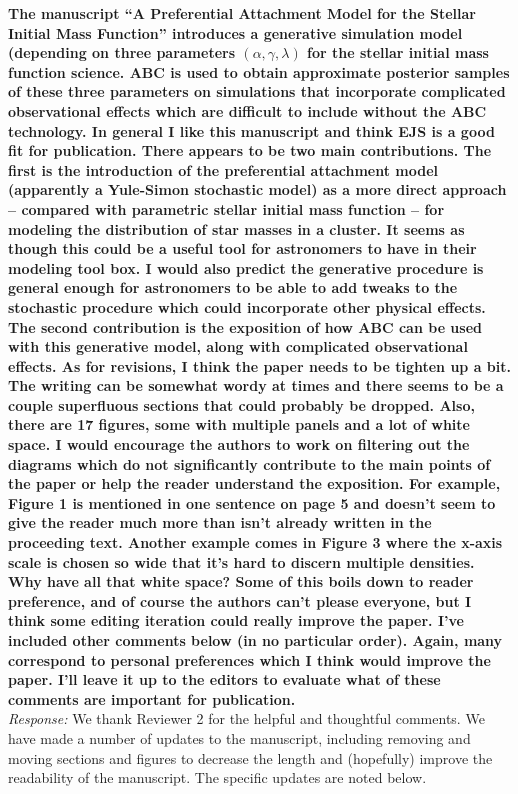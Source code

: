 \documentclass[11pt, oneside]{article}   	%
\begin{document}
{\bf The manuscript ``A Preferential Attachment Model for the Stellar Initial Mass Function'' introduces a generative simulation model (depending on three parameters $(\alpha, \gamma, \lambda)$ for the stellar initial mass function science. ABC is used to obtain approximate posterior samples of these three parameters on simulations that incorporate complicated observational effects which are difficult to include without the ABC technology.
In general I like this manuscript and think EJS is a good fit for publication. There appears to be two main contributions. The first is the introduction of the preferential attachment model (apparently a Yule-Simon stochastic model) as a more direct approach -- compared with parametric stellar initial mass function -- for modeling the distribution of star masses in a cluster. It seems as though this could be a useful tool for astronomers to have in their modeling tool box. I would also predict the generative procedure is general enough for astronomers to be able to add tweaks to the stochastic procedure which could incorporate other physical effects. The second contribution is the exposition of how ABC can be used with this generative model, along with complicated observational effects.
As for revisions, I think the paper needs to be tighten up a bit. The writing can be somewhat wordy at times and there seems to be a couple superfluous sections that could probably be dropped. Also, there are 17 figures, some with multiple panels and a lot of white space. I would encourage the authors to work on filtering out the diagrams which do not significantly contribute to the main points of the paper or help the reader understand the exposition. For example, Figure 1 is mentioned in one sentence on page 5 and doesn't seem to give the reader much more than isn't already written in the proceeding text. Another example comes in Figure 3 where the x-axis scale is chosen so wide that it's hard to discern multiple densities. Why have all that white space? Some of this boils down to reader preference, and of course the authors can't please everyone, but I think some editing iteration could really improve the paper. I've included other comments below (in no particular order). Again, many correspond to personal preferences which I think would improve the paper. I'll leave it up to the editors to evaluate what of these comments are important for publication.
} \\
\noindent \emph{Response:} We thank Reviewer 2 for the helpful and thoughtful comments.  We have made a number of updates to the manuscript, including removing and moving sections and figures to decrease the length and (hopefully) improve the readability of the manuscript.  The specific updates are noted below.
\bigskip
\end{document}
